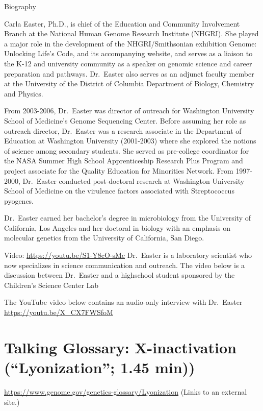 \documentclass[
]{book}
\begin{document}
Biography

Carla Easter, Ph.D., is chief of the Education and Community Involvement Branch at the National Human Genome Research Institute (NHGRI). She played a major role in the development of the NHGRI/Smithsonian exhibition Genome: Unlocking Life's Code, and its accompanying website, and serves as a liaison to the K-12 and university community as a speaker on genomic science and career preparation and pathways. Dr.~Easter also serves as an adjunct faculty member at the University of the District of Columbia Department of Biology, Chemistry and Physics.

From 2003-2006, Dr.~Easter was director of outreach for Washington University School of Medicine's Genome Sequencing Center. Before assuming her role as outreach director, Dr.~Easter was a research associate in the Department of Education at Washington University (2001-2003) where she explored the notions of science among secondary students. She served as pre-college coordinator for the NASA Summer High School Apprenticeship Research Plus Program and project associate for the Quality Education for Minorities Network. From 1997-2000, Dr.~Easter conducted post-doctoral research at Washington University School of Medicine on the virulence factors associated with Streptococcus pyogenes.

Dr.~Easter earned her bachelor's degree in microbiology from the University of California, Los Angeles and her doctoral in biology with an emphasis on molecular genetics from the University of California, San Diego.

Video: \url{https://youtu.be/S1-Y8cO-sMc}
Dr.~Easter is a laboratory scientist who now specializes in science communication and outreach. The video below is a discussion between Dr.~Easter and a highschool student sponsored by the Children's Science Center Lab

The YouTube video below contains an audio-only interview with Dr.~Easter
\url{https://youtu.be/X_CX7FWSfoM}

\hypertarget{talking-glossary-x-inactivation-lyonization-1.45-min}{%
\section{Talking Glossary: X-inactivation (``Lyonization''; 1.45 min))}\label{talking-glossary-x-inactivation-lyonization-1.45-min}}

\url{https://www.genome.gov/genetics-glossary/Lyonization} (Links to an external site.)
\end{document}
